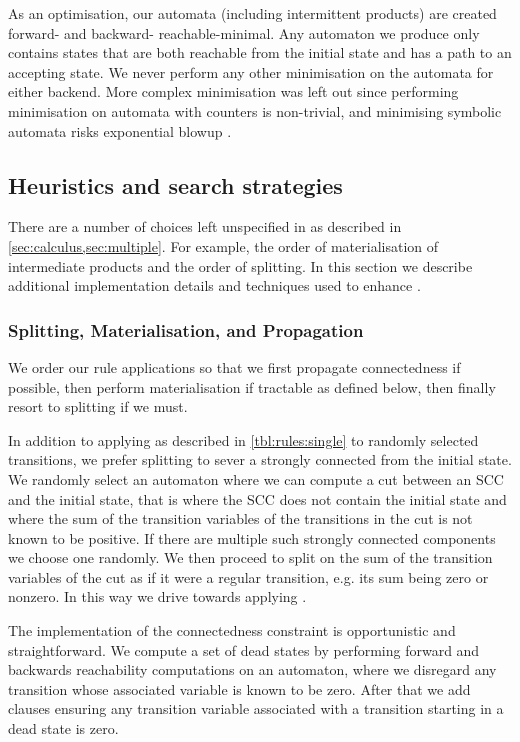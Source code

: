 \documentclass[acmsmall,review,anonymous,screen]{acmart}\settopmatter{printfolios=true,printccs=false,printacmref=true}
\theoremstyle{definition}
\begin{document}
As an optimisation, our automata (including intermittent products) are created
forward- and backward- reachable-minimal. Any automaton we produce only contains
states that are both reachable from the initial state and has a path to an
accepting state. We never perform any other minimisation on the automata for
either backend. More complex minimisation was left out since performing
minimisation on automata with counters is non-trivial, and minimising symbolic
automata risks exponential blowup \cite{minimising-symbolic}.

\subsection{Heuristics and search strategies}

There are a number of choices left unspecified in \Calculus{} as described in
\cref{sec:calculus,sec:multiple}. For example, the order of materialisation of
intermediate products and the order of splitting. In this section we describe
additional implementation details and techniques used to enhance \Catra.

\subsubsection{Splitting, Materialisation, and Propagation}

We order our rule applications so that we first propagate connectedness if
possible, then perform materialisation if tractable as defined below, then
finally resort to splitting if we must.

In addition to applying \Split{} as described in \cref{tbl:rules:single} to
randomly selected transitions, we prefer splitting to sever a strongly connected
from the initial state. We randomly select an automaton where we can compute a
cut between an SCC and the initial state, that is where the SCC does not contain
the initial state and where the sum of the transition variables of the
transitions in the cut is not known to be positive. If there are multiple such
strongly connected components we choose one randomly. We then proceed to split
on the sum of the transition variables of the cut as if it were a regular
transition, e.g. its sum being zero or nonzero. In this way we drive \Calculus{}
towards applying \Propagate{}.

The implementation of the connectedness constraint is opportunistic and straightforward. We compute a set of dead states by performing forward and backwards reachability computations on an automaton, where we disregard any transition whose associated variable is known to be zero. After that we add clauses ensuring any transition variable associated with a transition starting in a dead state is zero.
\end{document}
